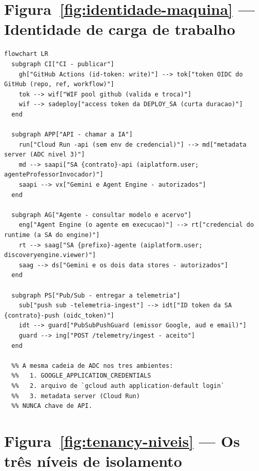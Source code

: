 \section{Figura~\ref{fig:identidade-maquina} --- Identidade de carga de trabalho}

\begin{lstlisting}[language=mermaid]
flowchart LR
  subgraph CI["CI - publicar"]
    gh["GitHub Actions (id-token: write)"] --> tok["token OIDC do GitHub (repo, ref, workflow)"]
    tok --> wif["WIF pool github (valida e troca)"]
    wif --> sadeploy["access token da DEPLOY_SA (curta duracao)"]
  end

  subgraph APP["API - chamar a IA"]
    run["Cloud Run -api (sem env de credencial)"] --> md["metadata server (ADC nivel 3)"]
    md --> saapi["SA {contrato}-api (aiplatform.user; agenteProfessorInvocador)"]
    saapi --> vx["Gemini e Agent Engine - autorizados"]
  end

  subgraph AG["Agente - consultar modelo e acervo"]
    eng["Agent Engine (o agente em execucao)"] --> rt["credencial do runtime (a SA do engine)"]
    rt --> saag["SA {prefixo}-agente (aiplatform.user; discoveryengine.viewer)"]
    saag --> ds["Gemini e os dois data stores - autorizados"]
  end

  subgraph PS["Pub/Sub - entregar a telemetria"]
    sub["push sub -telemetria-ingest"] --> idt["ID token da SA {contrato}-push (oidc_token)"]
    idt --> guard["PubSubPushGuard (emissor Google, aud e email)"]
    guard --> ing["POST /telemetry/ingest - aceito"]
  end

  %% A mesma cadeia de ADC nos tres ambientes:
  %%   1. GOOGLE_APPLICATION_CREDENTIALS
  %%   2. arquivo de `gcloud auth application-default login`
  %%   3. metadata server (Cloud Run)
  %% NUNCA chave de API.
\end{lstlisting}

\section{Figura~\ref{fig:tenancy-niveis} --- Os três níveis de isolamento}


